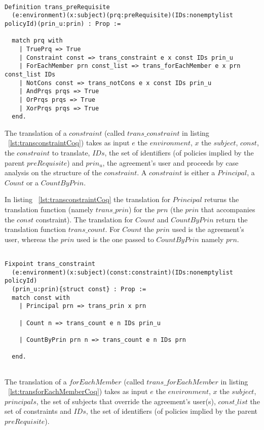 \begin{lstlisting}

Definition trans_preRequisite
  (e:environment)(x:subject)(prq:preRequisite)(IDs:nonemptylist policyId)(prin_u:prin) : Prop := 

  match prq with
    | TruePrq => True
    | Constraint const => trans_constraint e x const IDs prin_u 
    | ForEachMember prn const_list => trans_forEachMember e x prn const_list IDs 
    | NotCons const => trans_notCons e x const IDs prin_u 
    | AndPrqs prqs => True 
    | OrPrqs prqs => True 
    | XorPrqs prqs => True 
  end.
\end{lstlisting}

The translation of a $constraint$ (called $trans\_constraint$ in listing ~\ref{lst:transconstraintCoq}) takes as input $e$ the $environment$, $x$ the $subject$, $const$, the $constraint$ to translate, $IDs$, the set of identifiers (of policies implied by the parent $preRequisite$) and $prin_{u}$, the agreement's user and proceeds by case analysis on the structure of the $constraint$. A $constraint$ is either a $Principal$, a $Count$ or a $CountByPrin$.

In listing ~\ref{lst:transconstraintCoq} the translation for $Principal$ returns the translation function (namely $trans\_prin$) for the $prn$ (the $prin$ that accompanies the $const$ constraint). The translation for $Count$ and $CountByPrin$ return the translation function $trans\_count$. For $Count$ the $prin$ used is the agreement's user, whereas the $prin$ used is the one passed to $CountByPrin$ namely $prn$.


\begin{lstlisting}

Fixpoint trans_constraint 
  (e:environment)(x:subject)(const:constraint)(IDs:nonemptylist policyId)
  (prin_u:prin){struct const} : Prop := 
  match const with
    | Principal prn => trans_prin x prn
  
    | Count n => trans_count e n IDs prin_u 

    | CountByPrin prn n => trans_count e n IDs prn 

  end.
  
\end{lstlisting}

The translation of a $forEachMember$ (called $trans\_forEachMember$ in listing ~\ref{lst:transforEachMemberCoq}) takes as input $e$ the $environment$, $x$ the $subject$, $principals$, the set of subjects that override the agreement's user(s), $const\_list$ the set of constraints and $IDs$, the set of identifiers (of policies implied by the parent $preRequisite$).

